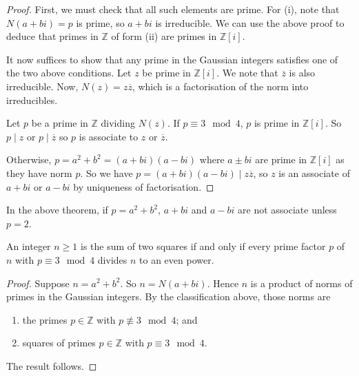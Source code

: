 \begin{proof}
	First, we must check that all such elements are prime.
	For (i), note that $N(a+bi) = p$ is prime, so $a+bi$ is irreducible.
	We can use the above proof to deduce that primes in $\mathbb Z$ of form (ii) are primes in $\mathbb Z[i]$.

	It now suffices to show that any prime in the Gaussian integers satisfies one of the two above conditions.
	Let $z$ be prime in $\mathbb Z[i]$.
	We note that $\overline z$ is also irreducible.
	Now, $N(z) = z\overline z$, which is a factorisation of the norm into irreducibles.

	Let $p$ be a prime in $\mathbb Z$ dividing $N(z)$.
	If $p \equiv 3 \mod 4$, $p$ is prime in $\mathbb Z[i]$.
	So $p \mid z$ or $p \mid \overline z$ so $p$ is associate to $z$ or $\overline z$.

	Otherwise, $p = a^2 + b^2 = (a+bi)(a-bi)$ where $a \pm bi$ are prime in $\mathbb Z[i]$ as they have norm $p$.
	So we have $p = (a+bi)(a-bi) \mid z \overline z$, so $z$ is an associate of $a+bi$ or $a-bi$ by uniqueness of factorisation.
\end{proof}
\begin{remark}
	In the above theorem, if $p = a^2 + b^2$, $a+bi$ and $a-bi$ are not associate unless $p = 2$.
\end{remark}
\begin{corollary}
	An integer $n \geq 1$ is the sum of two squares if and only if every prime factor $p$ of $n$ with $p \equiv 3 \mod 4$ divides $n$ to an even power.
\end{corollary}
\begin{proof}
	Suppose $n = a^2 + b^2$.
	So $n = N(a+bi)$.
	Hence $n$ is a product of norms of primes in the Gaussian integers.
	By the classification above, those norms are
	\begin{enumerate}
		\item the primes $p \in \mathbb Z$ with $p \not\equiv 3 \mod 4$; and
		\item squares of primes $p \in \mathbb Z$ with $p \equiv 3 \mod 4$.
	\end{enumerate}
	The result follows.
\end{proof}
